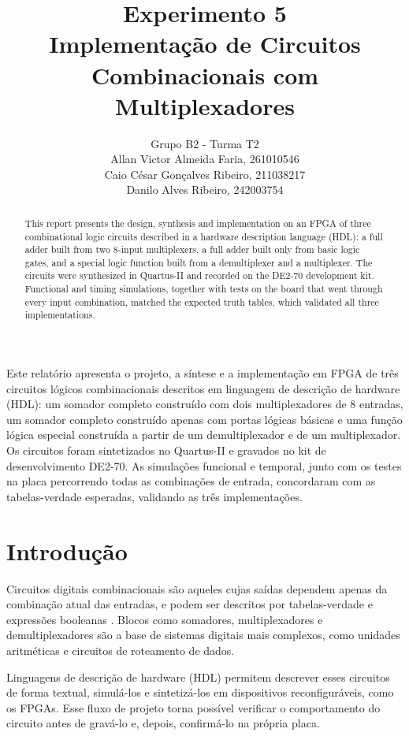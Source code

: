 \documentclass[12pt]{article}
\title{Experimento 5\\ 
Implementação de Circuitos Combinacionais com Multiplexadores}
\author{Grupo B2 - Turma T2\\   
        Allan Victor Almeida Faria, 261010546\\
        Caio César Gonçalves Ribeiro,  211038217\\
        Danilo Alves Ribeiro,  242003754\\
}
\begin{document}
 
\maketitle


\begin{abstract}
This report presents the design, synthesis and implementation on an FPGA of three combinational logic circuits described in a hardware description language (HDL): a full adder built from two 8-input multiplexers, a full adder built only from basic logic gates, and a special logic function built from a demultiplexer and a multiplexer. The circuits were synthesized in Quartus-II and recorded on the DE2-70 development kit. Functional and timing simulations, together with tests on the board that went through every input combination, matched the expected truth tables, which validated all three implementations.
\end{abstract}

\begin{resumo}
Este relatório apresenta o projeto, a síntese e a implementação em FPGA de três circuitos lógicos combinacionais descritos em linguagem de descrição de hardware (HDL): um somador completo construído com dois multiplexadores de 8 entradas, um somador completo construído apenas com portas lógicas básicas e uma função lógica especial construída a partir de um demultiplexador e de um multiplexador. Os circuitos foram sintetizados no Quartus-II e gravados no kit de desenvolvimento DE2-70. As simulações funcional e temporal, junto com os testes na placa percorrendo todas as combinações de entrada, concordaram com as tabelas-verdade esperadas, validando as três implementações.
\end{resumo}



\section{Introdução}
\label{sec:Introducao}

Circuitos digitais combinacionais são aqueles cujas saídas dependem apenas da combinação atual das entradas, e podem ser descritos por tabelas-verdade e expressões booleanas \cite{wakerly90}. Blocos como somadores, multiplexadores e demultiplexadores são a base de sistemas digitais mais complexos, como unidades aritméticas e circuitos de roteamento de dados.

Linguagens de descrição de hardware (HDL) permitem descrever esses circuitos de forma textual, simulá-los e sintetizá-los em dispositivos reconfiguráveis, como os FPGAs. Esse fluxo de projeto torna possível verificar o comportamento do circuito antes de gravá-lo e, depois, confirmá-lo na própria placa.
\end{document}

